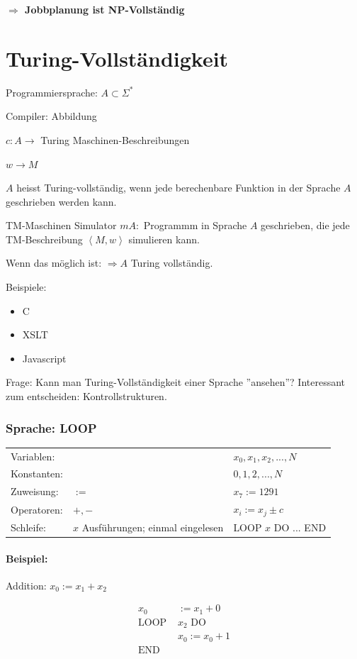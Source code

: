 \textbf{$\Rightarrow$ Jobbplanung ist NP-Vollständig}


\section{Turing-Vollständigkeit}

Programmiersprache: $A \subset \Sigma^\ast$

Compiler: Abbildung

$c: A \longrightarrow$ Turing Maschinen-Beschreibungen

$w \longrightarrow M$

$A$ heisst Turing-vollständig, wenn jede berechenbare Funktion in der Sprache $A$ geschrieben werden kann.

TM-Maschinen Simulator $m A:$ Programmm in Sprache $A$ geschrieben, die jede TM-Beschreibung $\left<M,w\right>$ simulieren kann.

Wenn das möglich ist: $\Rightarrow A$ Turing vollständig.

Beispiele:
\begin{itemize}
	\item C
	\item XSLT
	\item Javascript
\end{itemize}

Frage: Kann man Turing-Vollständigkeit einer Sprache ''ansehen''? Interessant zum entscheiden: Kontrollstrukturen.

\subsubsection{Sprache: LOOP}

\begin{tabu}{l l l}
Variablen: & & $x_0,x_1,x_2,...,N$ \\
Konstanten: & & $0,1,2,...,N$ \\
Zuweisung: & $:=$ & $x_7 := 1291$ \\
Operatoren: & $+,-$ & $x_i := x_j \pm c$ \\
Schleife: & $x$ Ausführungen; einmal eingelesen & LOOP $x$ DO ... END
\end{tabu}

\paragraph{Beispiel:}

Addition: $x_0 := x_1 + x_2$

\begin{align*}
	x_0 &:= x_1 + 0 \\
	\text{LOOP } & x_2 \text{ DO} \\
		& x_0 := x_0 + 1 \\
	\text{END}
\end{align*}

